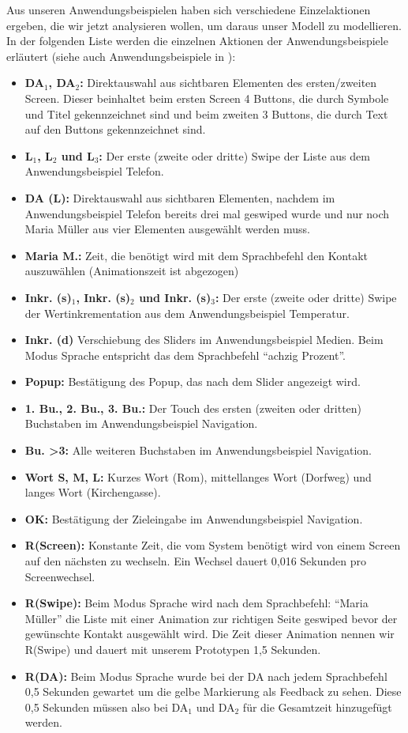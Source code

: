 Aus unseren Anwendungsbeispielen haben sich verschiedene Einzelaktionen ergeben, die wir jetzt analysieren wollen, um daraus unser Modell zu modellieren.
In der folgenden Liste werden die einzelnen Aktionen der Anwendungsbeispiele erläutert (siehe auch Anwendungsbeispiele in ):
\begin{itemize}
	\item \textbf{DA$_1$, DA$_2$:} Direktauswahl aus sichtbaren Elementen des ersten/zweiten Screen. Dieser beinhaltet beim ersten Screen 4 Buttons, die durch Symbole und Titel gekennzeichnet sind und beim zweiten 3 Buttons, die durch Text auf den Buttons gekennzeichnet sind.
	\item \textbf{L$_1$, L$_2$ und L$_3$:} Der erste (zweite oder dritte) Swipe der Liste aus dem Anwendungsbeispiel Telefon. 
	\item \textbf{DA (L):} Direktauswahl aus sichtbaren Elementen, nachdem im Anwendungsbeispiel Telefon bereits drei mal geswiped wurde und nur noch Maria Müller aus vier Elementen ausgewählt werden muss.	
	\item \textbf{Maria M.:} Zeit, die benötigt wird mit dem Sprachbefehl den Kontakt auszuwählen (Animationszeit ist abgezogen)
	\item \textbf{Inkr. (s)$_1$, Inkr. (s)$_2$ und Inkr. (s)$_3$:} Der erste (zweite oder dritte) Swipe der Wertinkrementation aus dem Anwendungsbeispiel Temperatur. 
	\item \textbf{Inkr. (d)} Verschiebung des Sliders im Anwendungsbeispiel Medien. Beim Modus Sprache entspricht das dem Sprachbefehl "`achzig Prozent"'.
	\item \textbf{Popup:} Bestätigung des Popup, das nach dem Slider angezeigt wird.
	\item \textbf{1. Bu., 2. Bu., 3. Bu.:} Der Touch des ersten (zweiten oder dritten) Buchstaben im Anwendungsbeispiel Navigation. 
	\item \textbf{Bu. >3:} Alle weiteren Buchstaben im Anwendungsbeispiel Navigation.
	\item \textbf{Wort S, M, L:} Kurzes Wort (Rom), mittellanges Wort (Dorfweg) und langes Wort (Kirchengasse).
	\item \textbf{OK:} Bestätigung der Zieleingabe im Anwendungsbeispiel Navigation. 
	\item \textbf{R(Screen):} Konstante Zeit, die vom System benötigt wird von einem Screen auf den nächsten zu wechseln. Ein Wechsel dauert 0,016 Sekunden pro Screenwechsel.
	\item \textbf{R(Swipe):} Beim Modus Sprache wird nach dem Sprachbefehl: "`Maria Müller"' die Liste mit einer Animation zur richtigen Seite geswiped bevor der gewünschte Kontakt ausgewählt wird. Die Zeit dieser Animation nennen wir R(Swipe) und dauert mit unserem Prototypen 1,5 Sekunden.
	\item \textbf{R(DA):} Beim Modus Sprache wurde bei der DA nach jedem Sprachbefehl 0,5 Sekunden gewartet um die gelbe Markierung als Feedback zu sehen. Diese 0,5 Sekunden müssen also bei DA$_1$ und DA$_2$ für die Gesamtzeit hinzugefügt werden.
\end{itemize}

